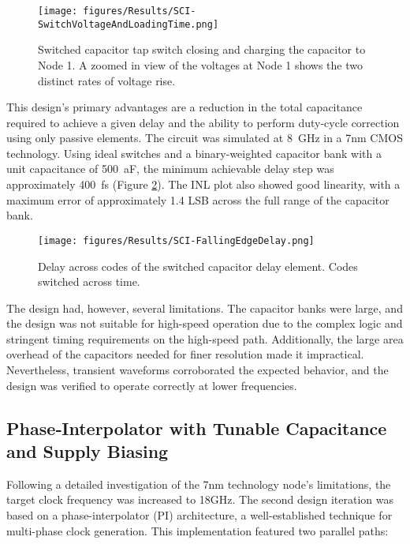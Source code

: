 \begin{figure}[H]
  \centering
  \texttt{[image: figures/Results/SCI-SwitchVoltageAndLoadingTime.png]}
  \caption{Switched capacitor tap switch closing and charging the capacitor to Node 1. A zoomed in view of the voltages at Node 1 shows the two distinct rates of voltage rise.}
  \label{fig:switched_cap_charging_cap_switch}
\end{figure}

This design's primary advantages are a reduction in the total capacitance required to achieve a given delay and the ability to perform duty-cycle correction using only passive elements. The circuit was simulated at \SI{8}{\giga\hertz} in a 7nm CMOS technology. Using ideal switches and a binary-weighted capacitor bank with a unit capacitance of \SI{500}{\atto\farad}, the minimum achievable delay step was approximately \SI{400}{\femto\second} (Figure \ref{fig:SCI_delayacrosscodes}). The INL plot also showed good linearity, with a maximum error of approximately 1.4 LSB across the full range of the capacitor bank.

\begin{figure}[H]
  \centering
  \texttt{[image: figures/Results/SCI-FallingEdgeDelay.png]}
  \caption{Delay across codes of the switched capacitor delay element. Codes switched across time.}
  \label{fig:SCI_delayacrosscodes}
\end{figure}

The design had, however, several limitations. The capacitor banks were large, and the design was not suitable for high-speed operation due to the complex logic and stringent timing requirements on the high-speed path. Additionally, the large area overhead of the capacitors needed for finer resolution made it impractical. Nevertheless, transient waveforms corroborated the expected behavior, and the design was verified to operate correctly at lower frequencies. 

\subsection{Phase‑Interpolator with Tunable Capacitance and Supply Biasing}\label{sec:pi_cap_supply}

Following a detailed investigation of the 7nm technology node's limitations, the target clock frequency was increased to 18GHz. The second design iteration was based on a phase-interpolator (PI) architecture, a well-established technique for multi-phase clock generation. This implementation featured two parallel paths:

